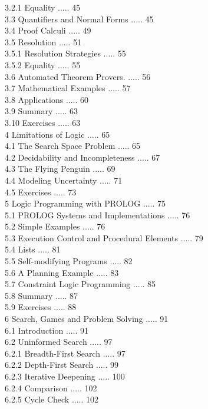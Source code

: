 \documentclass[10pt]{article}
\begin{document}
3.2.1 Equality ..... 45\\
3.3 Quantifiers and Normal Forms ..... 45\\
3.4 Proof Calculi ..... 49\\
3.5 Resolution ..... 51\\
3.5.1 Resolution Strategies ..... 55\\
3.5.2 Equality ..... 55\\
3.6 Automated Theorem Provers. ..... 56\\
3.7 Mathematical Examples ..... 57\\
3.8 Applications ..... 60\\
3.9 Summary ..... 63\\
3.10 Exercises ..... 63\\
4 Limitations of Logic ..... 65\\
4.1 The Search Space Problem ..... 65\\
4.2 Decidability and Incompleteness ..... 67\\
4.3 The Flying Penguin ..... 69\\
4.4 Modeling Uncertainty ..... 71\\
4.5 Exercises ..... 73\\
5 Logic Programming with PROLOG ..... 75\\
5.1 PROLOG Systems and Implementations ..... 76\\
5.2 Simple Examples ..... 76\\
5.3 Execution Control and Procedural Elements ..... 79\\
5.4 Lists ..... 81\\
5.5 Self-modifying Programs ..... 82\\
5.6 A Planning Example ..... 83\\
5.7 Constraint Logic Programming ..... 85\\
5.8 Summary ..... 87\\
5.9 Exercises ..... 88\\
6 Search, Games and Problem Solving ..... 91\\
6.1 Introduction ..... 91\\
6.2 Uninformed Search ..... 97\\
6.2.1 Breadth-First Search ..... 97\\
6.2.2 Depth-First Search ..... 99\\
6.2.3 Iterative Deepening ..... 100\\
6.2.4 Comparison ..... 102\\
6.2.5 Cycle Check ..... 102\\
\end{document}

